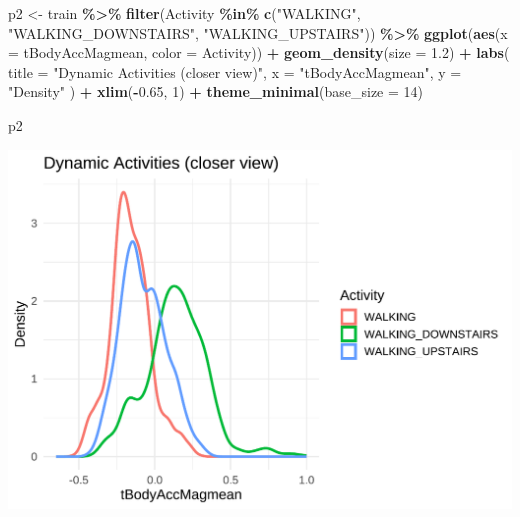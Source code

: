 \documentclass[
]{article}
\newenvironment{Shaded}{\begin{snugshade}}{\end{snugshade}}
\newcommand{\AttributeTok}[1]{\textcolor[rgb]{0.13,0.29,0.53}{#1}}
\newcommand{\DecValTok}[1]{\textcolor[rgb]{0.00,0.00,0.81}{#1}}
\newcommand{\FloatTok}[1]{\textcolor[rgb]{0.00,0.00,0.81}{#1}}
\newcommand{\FunctionTok}[1]{\textcolor[rgb]{0.13,0.29,0.53}{\textbf{#1}}}
\newcommand{\NormalTok}[1]{#1}
\newcommand{\OtherTok}[1]{\textcolor[rgb]{0.56,0.35,0.01}{#1}}
\newcommand{\SpecialCharTok}[1]{\textcolor[rgb]{0.81,0.36,0.00}{\textbf{#1}}}
\newcommand{\StringTok}[1]{\textcolor[rgb]{0.31,0.60,0.02}{#1}}
\begin{document}
\begin{Shaded}
\begin{Highlighting}[]
\NormalTok{p2 }\OtherTok{\textless{}{-}}\NormalTok{ train }\SpecialCharTok{\%\textgreater{}\%}
  \FunctionTok{filter}\NormalTok{(Activity }\SpecialCharTok{\%in\%} \FunctionTok{c}\NormalTok{(}\StringTok{"WALKING"}\NormalTok{, }\StringTok{"WALKING\_DOWNSTAIRS"}\NormalTok{, }\StringTok{"WALKING\_UPSTAIRS"}\NormalTok{)) }\SpecialCharTok{\%\textgreater{}\%}
  \FunctionTok{ggplot}\NormalTok{(}\FunctionTok{aes}\NormalTok{(}\AttributeTok{x =}\NormalTok{ tBodyAccMagmean, }\AttributeTok{color =}\NormalTok{ Activity)) }\SpecialCharTok{+}
  \FunctionTok{geom\_density}\NormalTok{(}\AttributeTok{size =} \FloatTok{1.2}\NormalTok{) }\SpecialCharTok{+}
  \FunctionTok{labs}\NormalTok{(}
    \AttributeTok{title =} \StringTok{"Dynamic Activities (closer view)"}\NormalTok{,}
    \AttributeTok{x =} \StringTok{"tBodyAccMagmean"}\NormalTok{,}
    \AttributeTok{y =} \StringTok{"Density"}
\NormalTok{  ) }\SpecialCharTok{+} \FunctionTok{xlim}\NormalTok{(}\SpecialCharTok{{-}}\FloatTok{0.65}\NormalTok{, }\DecValTok{1}\NormalTok{) }\SpecialCharTok{+}
  \FunctionTok{theme\_minimal}\NormalTok{(}\AttributeTok{base\_size =} \DecValTok{14}\NormalTok{)}

\NormalTok{p2}
\end{Highlighting}
\end{Shaded}

\includegraphics{report_files/figure-latex/unnamed-chunk-15-1.pdf}
\end{document}

